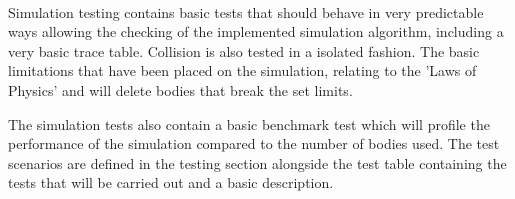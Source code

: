 \paragraph{}
Simulation testing contains basic tests that should behave in very predictable ways allowing the checking of the implemented simulation algorithm, including a very basic trace table. Collision is also tested in a isolated fashion. The basic limitations that have been placed on the simulation, relating to the 'Laws of Physics' and will delete bodies that break the set limits.

The simulation tests also contain a basic benchmark test which will profile the performance of the simulation compared to the number of bodies used. The test scenarios are defined in the testing section alongside the test table containing the tests that will be carried out and a basic description.
\pagebreak

